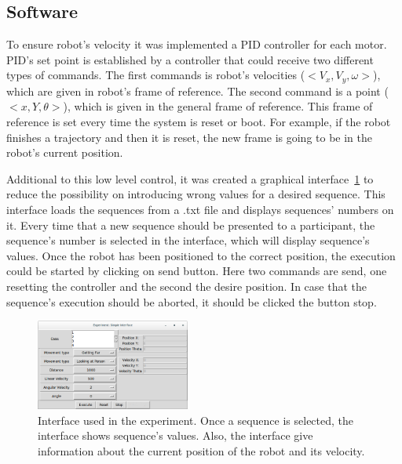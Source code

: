 \subsection{Software}
To ensure robot's velocity it was implemented a PID controller for each motor. PID's set point is established by a controller that could receive two different types of commands. The first commands is robot's velocities ($<V_x,V_y,\omega>$), which are given in robot's frame of reference. The second command is a point ($<x, Y, \theta>$), which is given in the general frame of reference. This frame of reference is set every time the system is reset or boot. For example, if the robot finishes a trajectory and then it is reset, the new frame is going to be in the robot's current position.  

Additional to this low level control, it was created a graphical interface~\ref{fig:experimental_interface} to reduce the possibility on introducing wrong values for a desired sequence. This interface loads the sequences from a .txt file and displays sequences' numbers on it. Every time that a new sequence should be presented to a participant, the sequence's number is selected in the interface, which will display sequence's values. Once the robot has been positioned to the correct position, the execution could be started by clicking on send button. Here two commands are send, one resetting the controller and the second the desire position. In case that the sequence's execution should be aborted, it should be clicked the button stop.

\begin{figure}
	\centering
	\includegraphics[width=0.45\textwidth]{./Images/ExperimentInterface.png} 
	\caption{Interface used in the experiment. Once a sequence is selected, the interface shows sequence's values. Also, the interface give information about the current position of the robot and its velocity.}
	\label{fig:experimental_interface}
\end{figure}